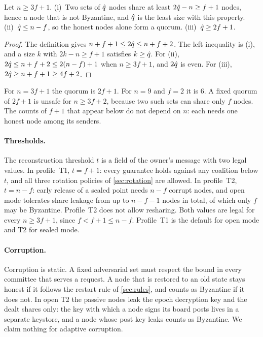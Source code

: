 \begin{lemma}[Quorum]\label{lem:quorum}
Let $n \ge 3f+1$. \textup{(i)}~Two sets of $\hat{q}$ nodes share at least $2\hat{q} - n \ge f+1$ nodes, hence a node that is not Byzantine, and $\hat{q}$ is the least size with this property. \textup{(ii)}~$\hat{q} \le n-f$, so the honest nodes alone form a quorum. \textup{(iii)}~$\hat{q} \ge 2f+1$.
\end{lemma}

\begin{proof}
The definition gives $n+f+1 \le 2\hat{q} \le n+f+2$. The left inequality is (i), and a size $k$ with $2k - n \ge f+1$ satisfies $k \ge \hat{q}$. For (ii), $2\hat{q} \le n+f+2 \le 2(n-f)+1$ when $n \ge 3f+1$, and $2\hat{q}$ is even. For (iii), $2\hat{q} \ge n+f+1 \ge 4f+2$.
\end{proof}

For $n = 3f+1$ the quorum is $2f+1$. For $n = 9$ and $f = 2$ it is $6$. A fixed quorum of $2f+1$ is unsafe for $n \ge 3f+2$, because two such sets can share only $f$ nodes. The counts of $f+1$ that appear below do not depend on $n$: each needs one honest node among its senders.

\paragraph{Thresholds.} The reconstruction threshold $t$ is a field of the owner's message with two legal values. In profile~T1, $t = f+1$: every guarantee holds against any coalition below $t$, and all three rotation policies of \cref{sec:rotation} are allowed. In profile~T2, $t = n-f$: early release of a sealed point needs $n-f$ corrupt nodes, and open mode tolerates share leakage from up to $n-f-1$ nodes in total, of which only $f$ may be Byzantine. Profile~T2 does not allow resharing. Both values are legal for every $n \ge 3f+1$, since $f < f+1 \le n-f$. Profile~T1 is the default for open mode and T2 for sealed mode.

\paragraph{Corruption.} Corruption is static. A fixed adversarial set must respect the bound in every committee that serves a request. A node that is restored to an old state stays honest if it follows the restart rule of \cref{sec:rules}, and counts as Byzantine if it does not. In open T2 the passive nodes leak the epoch decryption key and the dealt shares only: the key with which a node signs its board posts lives in a separate keystore, and a node whose post key leaks counts as Byzantine. We claim nothing for adaptive corruption.

